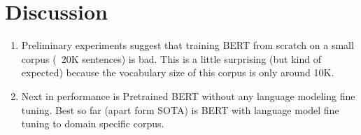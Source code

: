 \section{Discussion}
\label{sec:discussion}

\begin{enumerate}
	\item Preliminary experiments suggest that training BERT from scratch on a small corpus (~20K sentences) is bad. This is a little surprising (but kind of expected) because the vocabulary size of this corpus is only around 10K.
	\item Next in performance is Pretrained BERT without any language modeling fine tuning. Best so far (apart form SOTA) is BERT with language model fine tuning to domain specific corpus.
\end{enumerate}